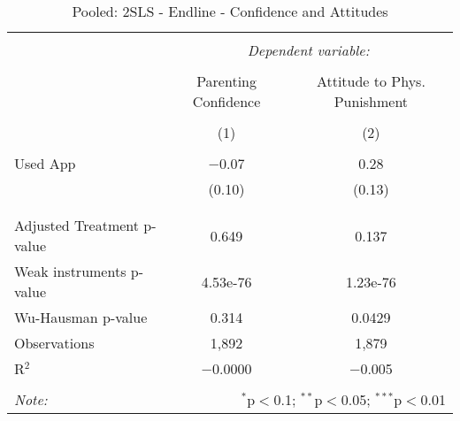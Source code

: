 
\begin{table}[!htbp] \centering 
  \caption{Pooled: 2SLS - Endline - Confidence and Attitudes} 
  \label{tbl:Pooled: 2SLS - Endline - Confidence and Attitudes} 
\begin{tabular}{@{\extracolsep{5pt}}lcc} 
\\[-1.8ex]\hline 
\hline \\[-1.8ex] 
 & \multicolumn{2}{c}{\textit{Dependent variable:}} \\ 
\cline{2-3} 
\\[-1.8ex] & Parenting Confidence & Attitude to Phys. Punishment \\ 
\\[-1.8ex] & (1) & (2)\\ 
\hline \\[-1.8ex] 
 Used App & $-$0.07 & 0.28 \\ 
  & (0.10) & (0.13) \\ 
  & & \\ 
\hline \\[-1.8ex] 
Adjusted Treatment p-value & 0.649 & 0.137 \\ 
Weak instruments p-value & 4.53e-76 & 1.23e-76 \\ 
Wu-Hausman p-value & 0.314 & 0.0429 \\ 
Observations & 1,892 & 1,879 \\ 
R$^{2}$ & $-$0.0000 & $-$0.005 \\ 
\hline 
\hline \\[-1.8ex] 
\textit{Note:}  & \multicolumn{2}{r}{$^{*}$p$<$0.1; $^{**}$p$<$0.05; $^{***}$p$<$0.01} \\ 
\end{tabular} 
\end{table} 
